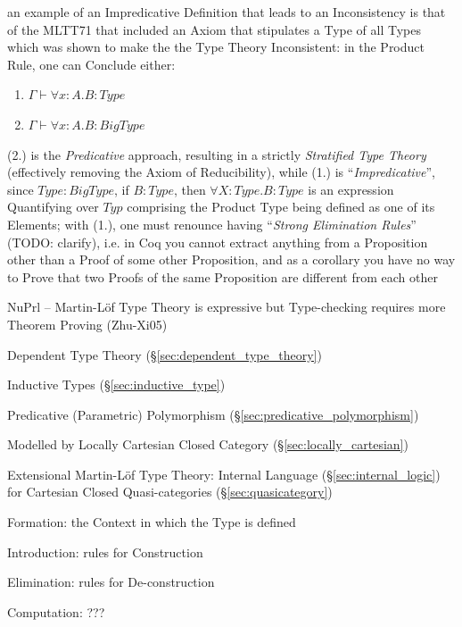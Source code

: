 an example of an Impredicative Definition that leads to an Inconsistency is that
of the MLTT71 that included an Axiom that stipulates a Type of all Types which
was shown to make the the Type Theory Inconsistent: in the Product Rule, one can
Conclude either:
\begin{enumerate}
  \item $\Gamma \vdash \forall x : A.B : Type$
  \item $\Gamma \vdash \forall x : A.B : BigType$
\end{enumerate}
(2.) is the \emph{Predicative} approach, resulting in a strictly
\emph{Stratified Type Theory} (effectively removing the Axiom of Reducibility),
while (1.) is ``\emph{Impredicative}'', since $Type : BigType$, if $B : Type$,
then $\forall X : Type.B : Type$ is an expression Quantifying over $Typ$
comprising the Product Type being defined as one of its Elements; with (1.), one
must renounce having ``\emph{Strong Elimination Rules}'' (TODO: clarify), i.e.
in Coq you cannot extract anything from a Proposition other than a Proof of some
other Proposition, and as a corollary you have no way to Prove that two Proofs
of the same Proposition are different from each other

\asterism

NuPrl -- Martin-L\"of Type Theory is expressive but Type-checking requires more
Theorem Proving (Zhu-Xi05) %

Dependent Type Theory (\S\ref{sec:dependent_type_theory})

Inductive Types (\S\ref{sec:inductive_type})

Predicative (Parametric) Polymorphism (\S\ref{sec:predicative_polymorphism})

Modelled by Locally Cartesian Closed Category (\S\ref{sec:locally_cartesian})

Extensional Martin-L\"of Type Theory: Internal Language
(\S\ref{sec:internal_logic}) for Cartesian Closed Quasi-categories
(\S\ref{sec:quasicategory})

Formation: the Context in which the Type is defined

Introduction: rules for Construction

Elimination: rules for De-construction

Computation: ???

